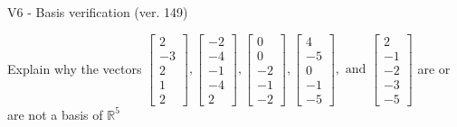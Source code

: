 \begin{exercise}
  \begin{exerciseTitle}V6 - Basis verification (ver. 149)\end{exerciseTitle}
  \begin{exerciseStatement}
    Explain why the vectors \(\left[\begin{array}{r}
2 \\
-3 \\
2 \\
1 \\
2
\end{array}\right] , \left[\begin{array}{r}
-2 \\
-4 \\
-1 \\
-4 \\
2
\end{array}\right] , \left[\begin{array}{r}
0 \\
0 \\
-2 \\
-1 \\
-2
\end{array}\right] , \left[\begin{array}{r}
4 \\
-5 \\
0 \\
-1 \\
-5
\end{array}\right] , \text{ and } \left[\begin{array}{r}
2 \\
-1 \\
-2 \\
-3 \\
-5
\end{array}\right]\) are or are not a basis of \(\mathbb{R}^5\)	



\end{exerciseStatement}
\end{exercise}
